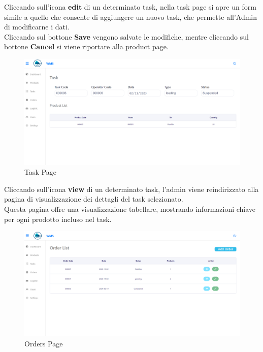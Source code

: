 Cliccando sull'icona \textbf{edit} di un determinato task, nella task page si apre un form simile a quello che
consente di aggiungere un nuovo task, che permette all'Admin di modificarne i dati.\\
Cliccando sul bottone \textbf{Save} vengono salvate le modifiche, mentre cliccando sul bottone \textbf{Cancel} si viene
riportare alla product page.

\begin{figure}[H]
    \centering
    \includegraphics[width=\textwidth]{document/sections/img/Storyboard/viewTask.png}
    \caption{Task Page}
    \label{fig:viewTasksPage}
\end{figure}

Cliccando sull'icona \textbf{view} di un determinato task, l’admin viene
reindirizzato alla pagina di visualizzazione dei dettagli del task selezionato.\\
Questa pagina offre una visualizzazione tabellare, mostrando informazioni chiave per ogni prodotto
incluso nel task.

\begin{figure}[H]
    \centering
    \includegraphics[width=\textwidth]{document/sections/img/Storyboard/orderPage.png}
    \caption{Orders Page}
    \label{fig:ordersPage}
\end{figure}

